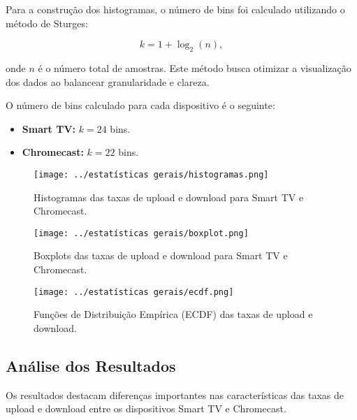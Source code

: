 Para a construção dos histogramas, o número de bins foi calculado utilizando o método de Sturges:

\begin{equation}\label{eq:sturges}
k = 1 + \log_2(n),
\end{equation}

onde \(n\) é o número total de amostras. Este método busca otimizar a visualização dos dados ao balancear granularidade e clareza.

O número de bins calculado para cada dispositivo é o seguinte:
\begin{itemize}
    \item \textbf{Smart TV:} \(k = 24\) bins.
    \item \textbf{Chromecast:} \(k = 22\) bins.
\end{itemize}

\begin{figure}[H]
    \centering
    \texttt{[image: ../estatísticas gerais/histogramas.png]}
    \caption{Histogramas das taxas de upload e download para Smart TV e Chromecast.}
    \label{fig:histogramas}
\end{figure}

\begin{figure}[H]
    \centering
    \texttt{[image: ../estatísticas gerais/boxplot.png]}
    \caption{Boxplots das taxas de upload e download para Smart TV e Chromecast.}
    \label{fig:boxplots}
\end{figure}

\begin{figure}[H]
    \centering
    \texttt{[image: ../estatísticas gerais/ecdf.png]}
    \caption{Funções de Distribuição Empírica (ECDF) das taxas de upload e download.}
    \label{fig:ecdf}
\end{figure}

\subsection{Análise dos Resultados}

Os resultados destacam diferenças importantes nas características das taxas de upload e download entre os dispositivos Smart TV e Chromecast.

